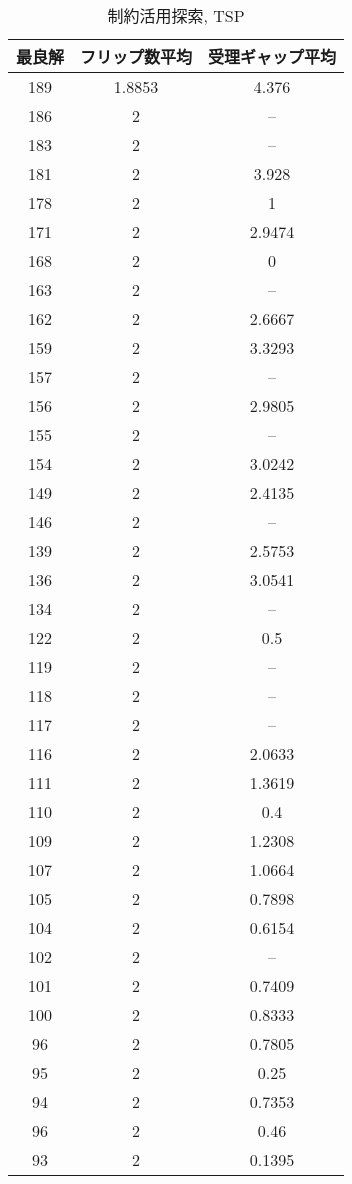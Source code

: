 \begin{table}[htbp]
  \centering
  \caption{制約活用探索, TSP}
  \begin{tabular}{ccc}
    \hline
    最良解 & フリップ数平均 & 受理ギャップ平均 \\
    \hline
    189 & 1.8853 & 4.376  \\
186 & 2      & --     \\
183 & 2      & --     \\
181 & 2      & 3.928  \\
178 & 2      & 1      \\
171 & 2      & 2.9474 \\
168 & 2      & 0      \\
163 & 2      & --     \\
162 & 2      & 2.6667 \\
159 & 2      & 3.3293 \\
157 & 2      & --     \\
156 & 2      & 2.9805 \\
155 & 2      & --     \\
154 & 2      & 3.0242 \\
149 & 2      & 2.4135 \\
146 & 2      & --     \\
139 & 2      & 2.5753 \\
136 & 2      & 3.0541 \\
134 & 2      & --     \\
122 & 2      & 0.5    \\
119 & 2      & --     \\
118 & 2      & --     \\
117 & 2      & --     \\
116 & 2      & 2.0633 \\
111 & 2      & 1.3619 \\
110 & 2      & 0.4    \\
109 & 2      & 1.2308 \\
107 & 2      & 1.0664 \\
105 & 2      & 0.7898 \\
104 & 2      & 0.6154 \\
102 & 2      & --     \\
101 & 2      & 0.7409 \\
100 & 2      & 0.8333 \\
96  & 2      & 0.7805 \\
95  & 2      & 0.25   \\
94  & 2      & 0.7353 \\
96  & 2      & 0.46   \\
93  & 2      & 0.1395 \\
    \hline
  \end{tabular}
\end{table}

